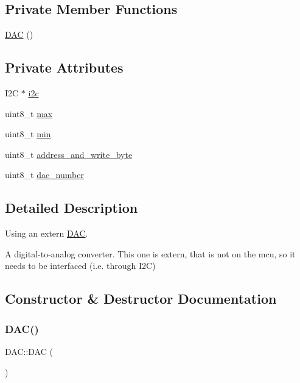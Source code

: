 \subsection*{Private Member Functions}
\begin{DoxyCompactItemize}
\item 
\hyperlink{class_d_a_c_a9908e07a5c096380eeb4c4061d58476d}{D\+AC} ()
\end{DoxyCompactItemize}
\subsection*{Private Attributes}
\begin{DoxyCompactItemize}
\item 
I2C $\ast$ \hyperlink{class_d_a_c_a70a9fd9603ee9fd9303628bd23338bf5}{i2c}
\item 
uint8\+\_\+t \hyperlink{class_d_a_c_a229a81d8ebf43511dfb6815c5cd8f425}{max}
\item 
uint8\+\_\+t \hyperlink{class_d_a_c_aa4f21cf166374cfc6edcd412f4d2072b}{min}
\item 
uint8\+\_\+t \hyperlink{class_d_a_c_a1dd1e9c4a63f493da44d7208e59cc83e}{address\+\_\+and\+\_\+write\+\_\+byte}
\item 
uint8\+\_\+t \hyperlink{class_d_a_c_afb39aacc3401c892403c477f857504f8}{dac\+\_\+number}
\end{DoxyCompactItemize}


\subsection{Detailed Description}
Using an extern \hyperlink{class_d_a_c}{D\+AC}. 

A digital-\/to-\/analog converter. This one is extern, that is not on the mcu, so it needs to be interfaced (i.\+e. through I2C) 

\subsection{Constructor \& Destructor Documentation}
\hypertarget{class_d_a_c_a9908e07a5c096380eeb4c4061d58476d}{}\label{class_d_a_c_a9908e07a5c096380eeb4c4061d58476d} 
\subsubsection{\texorpdfstring{D\+A\+C()}{DAC()}\hspace{0.1cm}{\footnotesize\ttfamily [1/2]}}
{\footnotesize\ttfamily D\+A\+C\+::\+D\+AC (\begin{DoxyParamCaption}{ }\end{DoxyParamCaption})\hspace{0.3cm}{\ttfamily [private]}}

